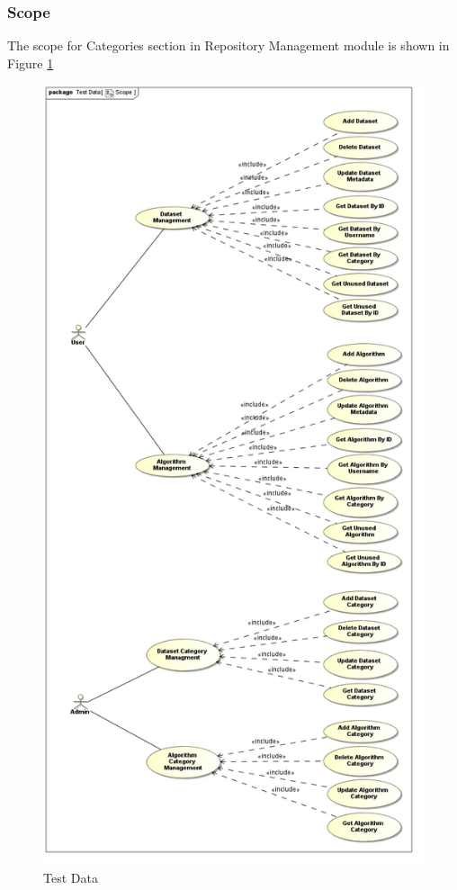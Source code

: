 \subsubsection{Scope}
The scope for Categories section in Repository Management module is shown in Figure \ref{fig:categoriesRepo}
\begin{figure}[H]
  \begin{center}
  \includegraphics[scale=0.7]{../Diagrams and Charts/Test Data/Scope.jpg}
  \caption{Test Data}
  \end{center}
  \label{fig:categoriesRepo}
\end{figure}
